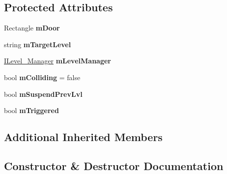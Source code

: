 \subsection*{Protected Attributes}
\begin{DoxyCompactItemize}
\item 
\mbox{\label{class_g_m_t_b_1_1_collision_system_1_1_door_a78ca5701abf287b33936348aba300112}} 
Rectangle {\bfseries m\+Door}
\item 
\mbox{\label{class_g_m_t_b_1_1_collision_system_1_1_door_a23c11cf35c999d1176819c8826b650aa}} 
string {\bfseries m\+Target\+Level}
\item 
\mbox{\label{class_g_m_t_b_1_1_collision_system_1_1_door_a84acfa15b9611945c1da7bd1cf18e187}} 
\mbox{\hyperlink{interface_g_m_t_b_1_1_interfaces_1_1_i_level___manager}{I\+Level\+\_\+\+Manager}} {\bfseries m\+Level\+Manager}
\item 
\mbox{\label{class_g_m_t_b_1_1_collision_system_1_1_door_a7e46ac79d6386dcb6e2bda5c0bef01d9}} 
bool {\bfseries m\+Colliding} = false
\item 
\mbox{\label{class_g_m_t_b_1_1_collision_system_1_1_door_a508ab86751e56274633b1d9cde4d4bd5}} 
bool {\bfseries m\+Suspend\+Prev\+Lvl}
\item 
\mbox{\label{class_g_m_t_b_1_1_collision_system_1_1_door_aaa230b8136eefde90b9aaeef0b493161}} 
bool {\bfseries m\+Triggered}
\end{DoxyCompactItemize}
\subsection*{Additional Inherited Members}


\subsection{Constructor \& Destructor Documentation}
\mbox{\label{class_g_m_t_b_1_1_collision_system_1_1_door_ae90b24f7ad2241cc276bdc625519e70d}} 

